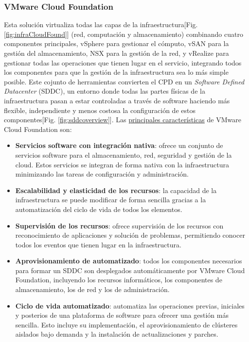 \subsubsection{VMware Cloud Foundation}
Esta solución virtualiza todas las capas de la infraestructura[Fig. \ref{fig:infraCloudFound}] (red, computación y almacenamiento) combinando cuatro componentes principales, vSphere para gestionar el cómputo, vSAN para la gestión del almacenamiento, NSX para la gestión de la red, y vRealize para gestionar todas las operaciones que tienen lugar en el servicio, integrando todos los componentes para que la gestión de la infraestructura sea lo más simple posible. Este cojunto de herramientas convierten el CPD en un \textit{Software Defined Datacenter} (SDDC), un entorno donde todas las partes físicas de la infraestructura pasan a estar controladas a través de software haciendo más flexible, independiente y menos costosa la configuración de estos componentes[Fig. \ref{fig:sddcoverview}]. Las \underline{principales características} de VMware Cloud Foundation son:
\begin{itemize}
    \item \textbf{Servicios software con integración nativa}: ofrece un conjunto de servicios software para el almacenamiento, red, seguridad y gestión de la cloud. Estos servicios se integran de forma nativa con la infraestructura minimizando las tareas de configuración y administración.
    \item \textbf{Escalabilidad y elasticidad de los recursos}: la capacidad de la infraestructura se puede modificar de forma sencilla gracias a la automatización del ciclo de vida de todos los elementos. 
    \item \textbf{Supervisión de los recursos}: ofrece supervisión de los recursos con reconocimiento de aplicaciones y solución de problemas, permitiendo conocer todos los eventos que tienen lugar en la infraestructura.
    \item \textbf{Aprovisionamiento de automatizado}: todos los componentes necesarios para formar un SDDC son desplegados automáticamente por VMware Cloud Foundation, incluyendo los recursos informáticos, los componentes de almacenamiento, los de red y los de administración.
    \item \textbf{Ciclo de vida automatizado}: automatiza las operaciones previas, iniciales y posterios de una plataforma de software para ofrecer una gestión más sencilla. Esto incluye su implementación, el aprovisionamiento de clústeres aislados bajo demanda y la instalación de actualizaciones y parches.
   

\end{itemize}

